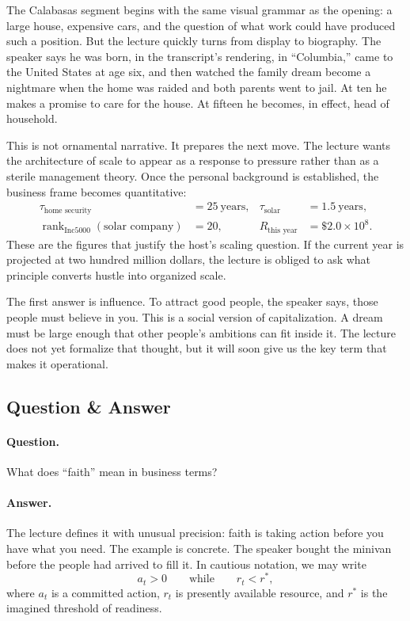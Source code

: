 The Calabasas segment begins with the same visual grammar as the opening: a large house, expensive cars, and the question of what work could have produced such a position. But the lecture quickly turns from display to biography. The speaker says he was born, in the transcript's rendering, in ``Columbia,'' came to the United States at age six, and then watched the family dream become a nightmare when the home was raided and both parents went to jail. At ten he makes a promise to care for the house. At fifteen he becomes, in effect, head of household.

This is not ornamental narrative. It prepares the next move. The lecture wants the architecture of scale to appear as a response to pressure rather than as a sterile management theory. Once the personal background is established, the business frame becomes quantitative:
\begin{align}
\tau_{\text{home security}} &= 25\ \text{years}, &
\tau_{\text{solar}} &= 1.5\ \text{years},\\
\operatorname{rank}_{\text{Inc5000}}(\text{solar company}) &= 20, &
R_{\text{this year}} &= \$2.0\times 10^8.
\end{align}
These are the figures that justify the host's scaling question. If the current year is projected at two hundred million dollars, the lecture is obliged to ask what principle converts hustle into organized scale.

The first answer is influence. To attract good people, the speaker says, those people must believe in you. This is a social version of capitalization. A dream must be large enough that other people's ambitions can fit inside it. The lecture does not yet formalize that thought, but it will soon give us the key term that makes it operational.

\subsection{Question \& Answer}

\paragraph{Question.} What does ``faith'' mean in business terms?

\paragraph{Answer.} The lecture defines it with unusual precision: faith is taking action before you have what you need. The example is concrete. The speaker bought the minivan before the people had arrived to fill it. In cautious notation, we may write
\begin{equation}
a_t > 0 \qquad \text{while} \qquad r_t < r^\ast,
\end{equation}
where \(a_t\) is a committed action, \(r_t\) is presently available resource, and \(r^\ast\) is the imagined threshold of readiness.

